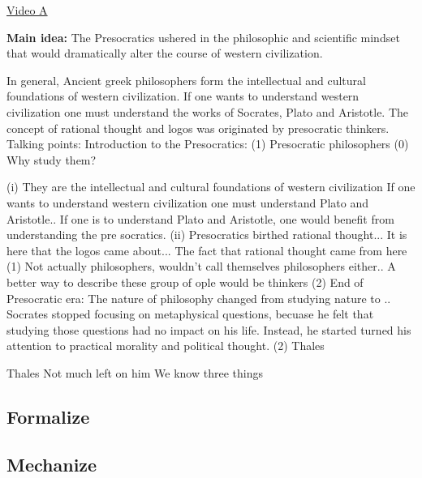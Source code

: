 \documentclass[twoside]{article}
\begin{document}
\href{https://www.youtube.com/watch?v=ZkMAx04jDx0}{Video A}

\textbf{Main idea:} The Presocratics ushered in the philosophic and scientific
mindset that would dramatically alter the course of western civilization.


In general, Ancient greek philosophers form the intellectual and cultural foundations
of western civilization. If one wants to understand western civilization one must understand
the works of Socrates, Plato and Aristotle.
The concept of rational thought and logos was originated by presocratic thinkers.
Talking points:
Introduction to the Presocratics:
(1) Presocratic philosophers
  (0) Why study them?

    (i) They are the intellectual and cultural foundations of western civilization
        If one wants to understand western civilization one must understand Plato
        and Aristotle.. If one is to understand Plato and Aristotle, one would
        benefit from understanding the pre socratics.
    (ii) Presocratics birthed rational thought... It is here that the logos
         came about... The fact that rational thought came from here
  (1) Not actually philosophers, wouldn't call themselves philosophers either..
      A better way to describe these group of ople would be thinkers
  (2) End of Presocratic era: The nature of philosophy changed from studying
  nature to .. Socrates stopped focusing on metaphysical questions, becuase
  he felt that studying those questions had no impact on his life. Instead, he started
  turned his attention to practical morality and political thought.
(2) Thales


Thales
Not much left on him
We know three things

\subsection{Formalize}

\subsection{Mechanize}
\end{document}

